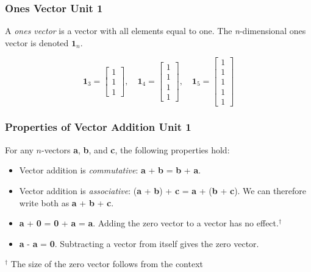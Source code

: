 \documentclass[12pt]{beamer}
\newcommand{\FrameTitle}[2]{\frametitle{#1 \hfill \small\textnormal{\textcolor{midgray}{#2}}}}
\newcommand{\vsp}{\vspace*{1em}}
\newcommand{\Vector}[1]{\textbf{#1}}
\begin{document}
\begin{frame}\FrameTitle{Ones Vector}{Unit 1}
    A \emph{ones vector} is a vector with all elements equal to one.
    \vsp
    The \emph{n}-dimensional ones vector is denoted $\Vector{1}_n$.

    \[
        \Vector{1}_3 = \begin{bmatrix}
            1 \\ 1 \\ 1
        \end{bmatrix}, \quad
        \Vector{1}_4 = \begin{bmatrix}
            1 \\ 1 \\ 1 \\ 1
        \end{bmatrix}, \quad
        \Vector{1}_5 = \begin{bmatrix}
            1 \\ 1 \\ 1 \\ 1 \\ 1
        \end{bmatrix}
    \]
\end{frame}

\begin{frame}\FrameTitle{Properties of Vector Addition}{Unit 1}
    For any $n$-vectors \Vector{a}, \Vector{b}, and \Vector{c}, the following properties hold:
    \begin{itemize}
        \item Vector addition is \emph{commutative}: \Vector{a} + \Vector{b} = \Vector{b} + \Vector{a}.
        \item Vector addition is \emph{associative}: (\Vector{a} + \Vector{b}) + \Vector{c} = \Vector{a} + (\Vector{b} + \Vector{c}). We can therefore
        write both as \Vector{a} + \Vector{b} + \Vector{c}.
        \item \Vector{a} + \textbf{0} = \Vector{0} + \Vector{a} = \Vector{a}. Adding the zero vector to a vector has no effect.$^{\dagger}$
        \item \Vector{a} - \Vector{a} = \Vector{0}. Subtracting a vector from itself gives the zero vector.
    \end{itemize}
    \vsp
    {\color{question}{Can you think of the geometric interpretation of these properties?}}
    \vfill
    $^{\dagger}$ The size of the zero vector follows from the context
\end{frame}
\end{document}
